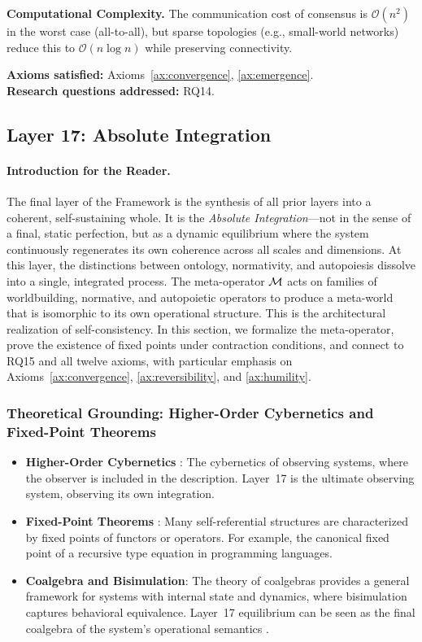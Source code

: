 \textbf{Computational Complexity.} The communication cost of consensus is $\mathcal{O}(n^2)$ in the worst case (all-to-all), but sparse topologies (e.g., small-world networks) reduce this to $\mathcal{O}(n \log n)$ while preserving connectivity.

\textbf{Axioms satisfied:} Axioms~\ref{ax:convergence}, \ref{ax:emergence}. \\
\textbf{Research questions addressed:} RQ14.

\subsection{Layer 17: Absolute Integration}
\label{subsec:layer17}

\paragraph{Introduction for the Reader.}
The final layer of the \Apeiron{} Framework is the synthesis of all prior layers into a coherent, self-sustaining whole. It is the \emph{Absolute Integration}—not in the sense of a final, static perfection, but as a dynamic equilibrium where the system continuously regenerates its own coherence across all scales and dimensions. At this layer, the distinctions between ontology, normativity, and autopoiesis dissolve into a single, integrated process. The meta-operator $\mathcal{M}$ acts on families of worldbuilding, normative, and autopoietic operators to produce a meta-world that is isomorphic to its own operational structure. This is the architectural realization of self-consistency. In this section, we formalize the meta-operator, prove the existence of fixed points under contraction conditions, and connect to RQ15 and all twelve axioms, with particular emphasis on Axioms~\ref{ax:convergence}, \ref{ax:reversibility}, and \ref{ax:humility}.

\subsubsection{Theoretical Grounding: Higher-Order Cybernetics and Fixed-Point Theorems}
\begin{itemize}
    \item \textbf{Higher-Order Cybernetics} \cite{vonfoerster1981}: The cybernetics of observing systems, where the observer is included in the description. Layer~17 is the ultimate observing system, observing its own integration.
    \item \textbf{Fixed-Point Theorems} \cite{maclane1971}: Many self-referential structures are characterized by fixed points of functors or operators. For example, the canonical fixed point of a recursive type equation in programming languages.
    \item \textbf{Coalgebra and Bisimulation}: The theory of coalgebras provides a general framework for systems with internal state and dynamics, where bisimulation captures behavioral equivalence. Layer~17 equilibrium can be seen as the final coalgebra of the system's operational semantics \cite{rutten2000universal}.
\end{itemize}

